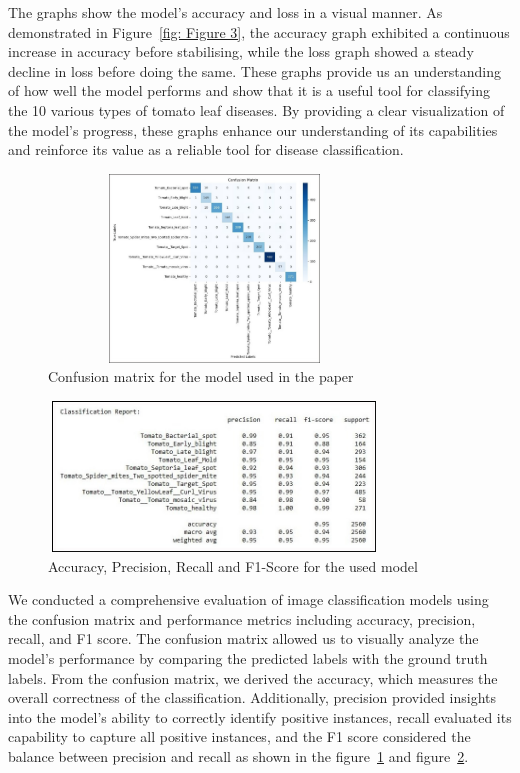 \documentclass[conference]{IEEEtran}
\begin{document}
The graphs show the model's accuracy and loss in a visual manner. As demonstrated in Figure~\ref{fig: Figure 3}, the accuracy graph exhibited a continuous increase in accuracy before stabilising, while the loss graph showed a steady decline in loss before doing the same. These graphs provide us an understanding of how well the model performs and show that it is a useful tool for classifying the 10 various types of tomato leaf diseases. By providing a clear visualization of the model's progress, these graphs enhance our understanding of its capabilities and reinforce its value as a reliable tool for disease classification.

 \begin{figure}[H]
 \includegraphics[width=8.8cm, height=5cm]{Tomato Confusion Matrix.jpg}
\caption{Confusion matrix for the model used in the paper}
\label{fig: Figure 4}
\end{figure}

 \begin{figure}[H]
 \includegraphics[width=8.8cm, height=4cm]{Tomato Stats.jpg}
\caption{Accuracy, Precision, Recall and F1-Score for the used model}
\label{fig: Figure 5}
\end{figure}

We conducted a comprehensive evaluation of image classification models using the confusion matrix and performance metrics including accuracy, precision, recall, and F1 score. The confusion matrix allowed us to visually analyze the model's performance by comparing the predicted labels with the ground truth labels. From the confusion matrix, we derived the accuracy, which measures the overall correctness of the classification. Additionally, precision provided insights into the model's ability to correctly identify positive instances, recall evaluated its capability to capture all positive instances, and the F1 score considered the balance between precision and recall as shown in the figure~\ref{fig: Figure 4} and figure~\ref{fig: Figure 5}.
  
\end{document}
